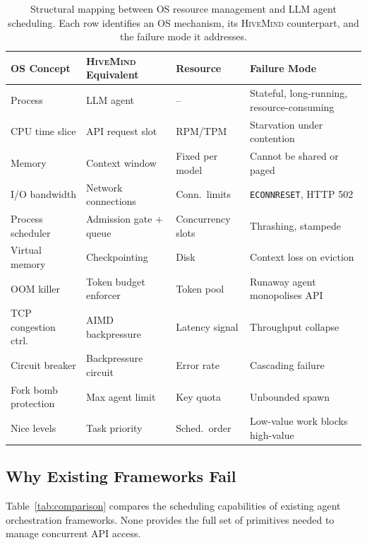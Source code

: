 \documentclass[11pt,twocolumn]{article}
\newcommand{\hm}{\textsc{HiveMind}}
\begin{document}
\begin{table}[t]
\centering
\footnotesize
\caption{Structural mapping between OS resource management and
LLM agent scheduling.  Each row identifies an OS mechanism,
its \hm{} counterpart, and the failure mode it addresses.}
\label{tab:analogy}
\begin{tabular}{@{}l l l p{4.8cm}@{}}
\toprule
OS Concept & \hm{} Equivalent & Resource & Failure Mode \\
\midrule
Process & LLM agent & -- & Stateful, long-running, resource-consuming \\
CPU time slice & API request slot & RPM/TPM & Starvation under contention \\
Memory & Context window & Fixed per model & Cannot be shared or paged \\
I/O bandwidth & Network connections & Conn.\ limits & \texttt{ECONNRESET}, HTTP 502 \\
Process scheduler & Admission gate + queue & Concurrency slots & Thrashing, stampede \\
Virtual memory & Checkpointing & Disk & Context loss on eviction \\
OOM killer & Token budget enforcer & Token pool & Runaway agent monopolises API \\
TCP congestion ctrl. & AIMD backpressure & Latency signal & Throughput collapse \\
Circuit breaker & Backpressure circuit & Error rate & Cascading failure \\
Fork bomb protection & Max agent limit & Key quota & Unbounded spawn \\
Nice levels & Task priority & Sched.\ order & Low-value work blocks high-value \\
\bottomrule
\end{tabular}
\end{table}

\subsection{Why Existing Frameworks Fail}

Table~\ref{tab:comparison} compares the scheduling capabilities
of existing agent orchestration frameworks.  None provides the
full set of primitives needed to manage concurrent API access.
\end{document}
